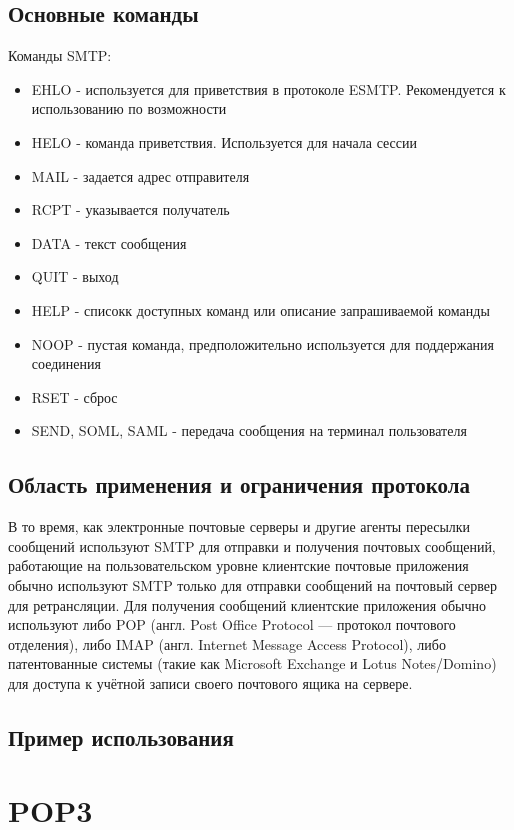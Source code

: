 \documentclass[a4paper,14pt]{extarticle}
\begin{document}
\subsection{Основные команды}
Команды SMTP:
\begin{itemize}
\item EHLO - используется для приветствия в протоколе ESMTP. Рекомендуется к использованию по возможности
\item HELO - команда приветствия. Используется для начала сессии
\item MAIL - задается адрес отправителя
\item RCPT - указывается получатель
\item DATA - текст сообщения
\item QUIT - выход
\item HELP - списокк доступных команд или описание запрашиваемой команды
\item NOOP - пустая команда, предположительно используется для поддержания соединения
\item RSET - сброс
\item SEND, SOML, SAML - передача сообщения на терминал пользователя
\end{itemize}


\subsection{Область применения и ограничения протокола}
В то время, как электронные почтовые серверы и другие агенты пересылки сообщений используют SMTP для отправки и получения почтовых сообщений, работающие на пользовательском уровне клиентские почтовые приложения обычно используют SMTP только для отправки сообщений на почтовый сервер для ретрансляции. Для получения сообщений клиентские приложения обычно используют либо POP (англ. Post Office Protocol — протокол почтового отделения), либо IMAP (англ. Internet Message Access Protocol), либо патентованные системы (такие как Microsoft Exchange и Lotus Notes/Domino) для доступа к учётной записи своего почтового ящика на сервере. 

\subsection{Пример использования}


\section{POP3}
\end{document}
